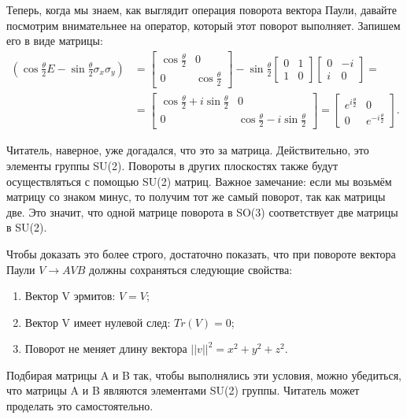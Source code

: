 Теперь, когда мы знаем, как выглядит операция поворота вектора Паули, давайте
посмотрим внимательнее на оператор, который этот поворот выполняет. Запишем его
в виде матрицы:
\begin{align*}
  \left(\cos\frac{\theta}{2}E - \sin\frac{\theta}{2}\sigma_x\sigma_y\right) &= \begin{bmatrix}\cos\frac{\theta}{2} & 0 \\ 0 & \cos\frac{\theta}{2}\end{bmatrix} - \sin\frac{\theta}{2}\begin{bmatrix}0 & 1 \\ 1 & 0\end{bmatrix}\begin{bmatrix}0 & -i \\ i & 0\end{bmatrix} = \\
  &= \begin{bmatrix}\cos\frac{\theta}{2} + i\sin\frac{\theta}{2} & 0 \\ 0 & \cos\frac{\theta}{2} - i\sin\frac{\theta}{2}\end{bmatrix} = \begin{bmatrix}e^{i\frac{\theta}{2}} & 0 \\ 0 & e^{-i\frac{\theta}{2}}\end{bmatrix}.
\end{align*}

Читатель, наверное, уже догадался, что это за матрица. Действительно, это
элементы группы SU(2). Повороты в других плоскостях также будут осуществляться
с помощью SU(2) матриц. Важное замечание: если мы возьмём матрицу со знаком
минус, то получим тот же самый поворот, так как матрицы две. Это значит, что
одной матрице поворота в SO(3) соответствует две матрицы в SU(2).

Чтобы доказать это более строго, достаточно показать, что при повороте вектора
Паули $V \rightarrow AVB$ должны сохраняться следующие свойства:
\begin{enumerate}
  \item Вектор V эрмитов: $V = V$;
  \item Вектор V имеет нулевой след: $Tr(V) = 0$;
  \item Поворот не меняет длину вектора $||v||^2 = x^2 + y^2 + z^2$.
\end{enumerate}
Подбирая матрицы A и B так, чтобы выполнялись эти условия, можно убедиться, что
матрицы A и B являются элементами SU(2) группы. Читатель может проделать это
самостоятельно.

